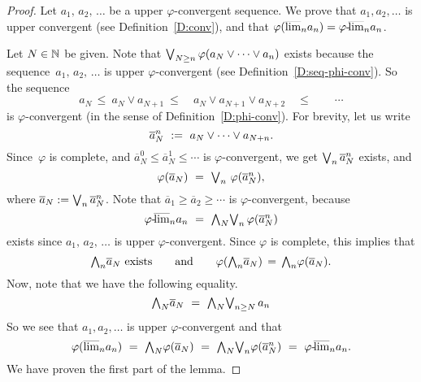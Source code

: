 \documentclass[main.tex]{subfiles}
\begin{document}
\begin{proof}
Let $a_1,\,a_2,\,\dotsc$ be a upper $\varphi$-convergent sequence.
We prove that $a_1,a_2,\dotsc$ is upper convergent
(see Definition~\ref{D:conv}),
and that $\varphi(\smash{\overline{\lim}_{n}}a_n) = {\varphi}\text{-}\!\smash{\overline{\lim}_{n}}a_n$.

Let $N\in\mathbb{N}$ be given.
Note that $\textstyle{\bigvee}_{N\geq n} \,\varphi(a_N\vee\dotsb\vee a_n)$
exists because the sequence~$a_1,\,a_2,\,\dotsc$ is upper $\varphi$-convergent
(see Definition~\ref{D:seq-phi-conv}).
So the sequence
\begin{equation*}
a_N \,\leq\ a_N \vee a_{N+1} 
    \ \leq\quad a_N\vee a_{N+1} \vee a_{N+2} 
    \quad \leq\qquad \dotsb
\end{equation*}
is $\varphi$-convergent (in the sense of
Definition~\ref{D:phi-conv}).
For brevity,
let us write
\begin{equation*}
\overline{a}_{N}^n \ := \ a_N\vee\dotsb\vee a_{N+n}.
\end{equation*}
Since~$\varphi$ is complete,
and $\overline{a}_N^0 \leq \overline{a}_N^1 \leq\dotsb$
is $\varphi$-convergent,
we get $\textstyle{\bigvee}_n\,\overline{a}_N^n$ exists,
and 
\begin{equation*}
\varphi(\overline{a}_N) 
\ =\ 
 \bv_{n}\ \varphi( \overline{a}_N^n),
\end{equation*}
where 
$\overline{a}_N := \textstyle{\bigvee}_n \,\overline{a}_N^n$.
Note that $\overline{a}_1 \geq \overline{a}_2 \geq\dotsb$
is $\varphi$-convergent,
because
\begin{equation*}
\pulim\varphi{n} a_n
\ =\ 
\bw_N\bv_n\, \varphi(\overline{a}^n_N)
\end{equation*}
exists since $a_1,\,a_2,\,\dotsc$ is upper $\varphi$-convergent.
Since $\varphi$ is complete,
this implies that
\begin{equation*}
\textstyle{\bigwedge}_n \overline{a}_N\text{ exists}
\qquad\text{and}\qquad \varphi(\textstyle{\bigwedge}_n \overline{a}_N)
\,=\,
\textstyle{\bigwedge}_n\varphi(\overline{a}_N).
\end{equation*}
Now,
note that  we have the following equality.
\begin{equation*}
\bw_N \overline{a}_N \ =\ 
\bw_N \bv_{n\geq N} \, a_n
\end{equation*}
So we see that $a_1,a_2,\dotsc$
is upper $\varphi$-convergent and that
\begin{equation*}
\varphi(\ulim{n}a_n)
\ =\ 
\bw_N\varphi(\overline{a}_N)
\ =\ 
\bw_N \bv_n \varphi(\overline{a}^n_N)
\ =\ 
\pulim\varphi{n} a_n.
\end{equation*}
We have proven the first part of the lemma.


\end{proof}
\end{document}
